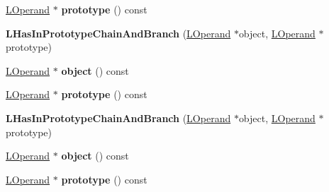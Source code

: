 \begin{DoxyCompactItemize}
\item 
\hyperlink{classv8_1_1internal_1_1_l_operand}{L\+Operand} $\ast$ {\bfseries prototype} () const \hypertarget{classv8_1_1internal_1_1_l_has_in_prototype_chain_and_branch_a064d5fd47ecfd5cadfaf5453641d0217}{}\label{classv8_1_1internal_1_1_l_has_in_prototype_chain_and_branch_a064d5fd47ecfd5cadfaf5453641d0217}

\item 
{\bfseries L\+Has\+In\+Prototype\+Chain\+And\+Branch} (\hyperlink{classv8_1_1internal_1_1_l_operand}{L\+Operand} $\ast$object, \hyperlink{classv8_1_1internal_1_1_l_operand}{L\+Operand} $\ast$prototype)\hypertarget{classv8_1_1internal_1_1_l_has_in_prototype_chain_and_branch_a986107e75af400f0ecb8ad0edc1d6c17}{}\label{classv8_1_1internal_1_1_l_has_in_prototype_chain_and_branch_a986107e75af400f0ecb8ad0edc1d6c17}

\item 
\hyperlink{classv8_1_1internal_1_1_l_operand}{L\+Operand} $\ast$ {\bfseries object} () const \hypertarget{classv8_1_1internal_1_1_l_has_in_prototype_chain_and_branch_a495e5c90fae5975c86c05b81abc64eb7}{}\label{classv8_1_1internal_1_1_l_has_in_prototype_chain_and_branch_a495e5c90fae5975c86c05b81abc64eb7}

\item 
\hyperlink{classv8_1_1internal_1_1_l_operand}{L\+Operand} $\ast$ {\bfseries prototype} () const \hypertarget{classv8_1_1internal_1_1_l_has_in_prototype_chain_and_branch_a064d5fd47ecfd5cadfaf5453641d0217}{}\label{classv8_1_1internal_1_1_l_has_in_prototype_chain_and_branch_a064d5fd47ecfd5cadfaf5453641d0217}

\item 
{\bfseries L\+Has\+In\+Prototype\+Chain\+And\+Branch} (\hyperlink{classv8_1_1internal_1_1_l_operand}{L\+Operand} $\ast$object, \hyperlink{classv8_1_1internal_1_1_l_operand}{L\+Operand} $\ast$prototype)\hypertarget{classv8_1_1internal_1_1_l_has_in_prototype_chain_and_branch_a986107e75af400f0ecb8ad0edc1d6c17}{}\label{classv8_1_1internal_1_1_l_has_in_prototype_chain_and_branch_a986107e75af400f0ecb8ad0edc1d6c17}

\item 
\hyperlink{classv8_1_1internal_1_1_l_operand}{L\+Operand} $\ast$ {\bfseries object} () const \hypertarget{classv8_1_1internal_1_1_l_has_in_prototype_chain_and_branch_a495e5c90fae5975c86c05b81abc64eb7}{}\label{classv8_1_1internal_1_1_l_has_in_prototype_chain_and_branch_a495e5c90fae5975c86c05b81abc64eb7}

\item 
\hyperlink{classv8_1_1internal_1_1_l_operand}{L\+Operand} $\ast$ {\bfseries prototype} () const \hypertarget{classv8_1_1internal_1_1_l_has_in_prototype_chain_and_branch_a064d5fd47ecfd5cadfaf5453641d0217}{}\label{classv8_1_1internal_1_1_l_has_in_prototype_chain_and_branch_a064d5fd47ecfd5cadfaf5453641d0217}


\end{DoxyCompactItemize}
